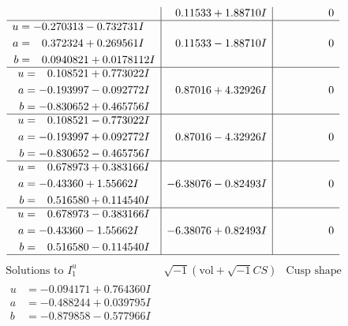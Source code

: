 \documentclass[1p]{elsarticle_modified}
\theoremstyle{definition}
\newcommand{\I}{\sqrt{-1}}
\begin{document}
$$\begin{array}{c|c|c}
 & \phantom{-}0.11533 + 1.88710 I & \phantom{-0.000000 } 0 \\ \hline\begin{aligned}
u &= -0.270313 - 0.732731 I \\
a &= \phantom{-}0.372324 + 0.269561 I \\
b &= \phantom{-}0.0940821 + 0.0178112 I\end{aligned}
 & \phantom{-}0.11533 - 1.88710 I & \phantom{-0.000000 } 0 \\ \hline\begin{aligned}
u &= \phantom{-}0.108521 + 0.773022 I \\
a &= -0.193997 - 0.092772 I \\
b &= -0.830652 + 0.465756 I\end{aligned}
 & \phantom{-}0.87016 + 4.32926 I & \phantom{-0.000000 } 0 \\ \hline\begin{aligned}
u &= \phantom{-}0.108521 - 0.773022 I \\
a &= -0.193997 + 0.092772 I \\
b &= -0.830652 - 0.465756 I\end{aligned}
 & \phantom{-}0.87016 - 4.32926 I & \phantom{-0.000000 } 0 \\ \hline\begin{aligned}
u &= \phantom{-}0.678973 + 0.383166 I \\
a &= -0.43360 + 1.55662 I \\
b &= \phantom{-}0.516580 + 0.114540 I\end{aligned}
 & -6.38076 - 0.82493 I & \phantom{-0.000000 } 0 \\ \hline\begin{aligned}
u &= \phantom{-}0.678973 - 0.383166 I \\
a &= -0.43360 - 1.55662 I \\
b &= \phantom{-}0.516580 - 0.114540 I\end{aligned}
 & -6.38076 + 0.82493 I & \phantom{-0.000000 } 0\\
 \hline 
 \end{array}$$\newpage$$\begin{array}{c|c|c}  
\text{Solutions to }I^u_{1}& \I (\text{vol} + \sqrt{-1}CS) & \text{Cusp shape}\\
 \hline 
\begin{aligned}
u &= -0.094171 + 0.764360 I \\
a &= -0.488244 + 0.039795 I \\
b &= -0.879858 - 0.577966 I\end{aligned}

\end{array}$$
\end{document}

